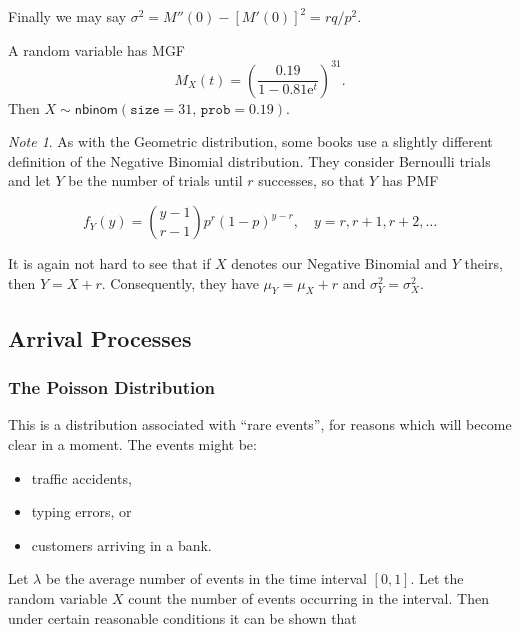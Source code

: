 \documentclass[]{book}
\providecommand{\tightlist}{%
  \setlength{\itemsep}{0pt}\setlength{\parskip}{0pt}}
\numberwithin{equation}{chapter}
\numberwithin{figure}{chapter}
\theoremstyle{plain}
\theoremstyle{definition}
\theoremstyle{remark}
\newtheorem{note}[thm]{Note}
\theoremstyle{definition}
\theoremstyle{definition}
\theoremstyle{remark}
\let\BeginKnitrBlock\begin \let\EndKnitrBlock\end
\begin{document}
Finally we may say \(\sigma^{2} = M''(0) - [M'(0)]^{2} = rq/p^{2}.\)

\bigskip

\BeginKnitrBlock{example}
\protect\hypertarget{ex:unnamed-chunk-240}{}{\label{ex:unnamed-chunk-240}}A
random variable has MGF \[
M_{X}(t)=\left(\frac{0.19}{1-0.81\mathrm{e}^{t}}\right)^{31}.
\] Then \(X\sim\mathsf{nbinom}(\mathtt{size}=31,\,\mathtt{prob}=0.19)\).
\EndKnitrBlock{example}

\bigskip

\begin{note}
As with the Geometric distribution, some books use a slightly different
definition of the Negative Binomial distribution. They consider
Bernoulli trials and let \(Y\) be the number of trials until \(r\)
successes, so that \(Y\) has PMF

\begin{equation}
f_{Y}(y)={y-1 \choose r-1}p^{r}(1-p)^{y-r},\quad y=r,r+1,r+2,\ldots
\end{equation}

It is again not hard to see that if \(X\) denotes our Negative Binomial
and \(Y\) theirs, then \(Y=X+r\). Consequently, they have
\(\mu_{Y}=\mu_{X}+r\) and \(\sigma_{Y}^{2}=\sigma_{X}^{2}\).
\end{note}

\subsection{Arrival Processes}\label{sec-arrival-processes}

\subsubsection{The Poisson
Distribution}\label{sub-the-poisson-distribution}

This is a distribution associated with ``rare events'', for reasons
which will become clear in a moment. The events might be:

\begin{itemize}
\tightlist
\item
  traffic accidents,
\item
  typing errors, or
\item
  customers arriving in a bank.
\end{itemize}

Let \(\lambda\) be the average number of events in the time interval
\([0,1]\). Let the random variable \(X\) count the number of events
occurring in the interval. Then under certain reasonable conditions it
can be shown that
\end{document}
